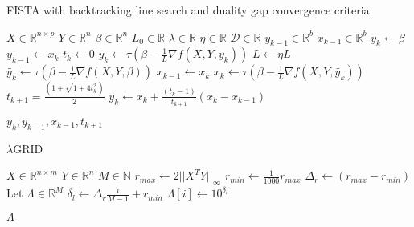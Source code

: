 \documentclass[letterpaper,11pt]{article}
\begin{document}
\begin{center}
\begin{center}
\begin{center}
\begin{center}
\FloatBarrier
\begin{algorithm}[!htbp]
  \caption{FISTA with backtracking line search and duality gap convergence criteria}
  \begin{algorithmic}[1]
  \Statex
  \Input{}
  \Statex $X \in \mathbb{R}^{n \times p} $ 
  \Statex $Y \in \mathbb{R}^n$  
  \Statex $\beta \in \mathbb{R}^n$  
  \Statex $L_0 \in \mathbb{R}$  
  \Statex $\lambda \in \mathbb{R}$  
  \Statex $\eta \in \mathbb{R}$  
  \Statex $\mathcal{D} \in \mathbb{R}$  
  \Statex $y_{k-1} \in \mathbb{R}^b$ 
  \Statex $x_{k-1} \in \mathbb{R}^b$ 
    \State $y_k \gets \beta$
      \Do
        \State $y_{k-1} \gets x_k$
        \State $t_k \gets 0$
        \State $ \widetilde{y_k} \gets \tau( \beta - \frac{1}{L} \nabla f( X, Y, y_k ) )$
          \State $L \gets \eta L$
          \State $\widetilde{y_k} \gets \tau( \beta - \frac{1}{L} \nabla f( X, Y, \beta ) )$
        \EndWhile
        \State $x_{k-1} \gets x_k$
        \State $x_k \gets \tau( \beta - \frac{1}{L} \nabla f( X, Y, \widetilde{y_k} ) )$
        \State $t_{k+1} = \frac{ \left( 1 + \sqrt{ 1 + 4 t_k^2} \right) }{ 2 }$
        \State $y_k \gets x_k + \frac{ \left( t_k - 1 \right) }{ t_{k+1} } \left( x_k - x_{k-1} \right)$
      \\
  \end{algorithmic}
  \Return $y_k, y_{k-1}, x_{k-1}, t_{k+1}$
\end{algorithm}
\FloatBarrier

\FloatBarrier
\begin{algorithm}[!htbp]
  \caption{ $\lambda$GRID }
  \begin{algorithmic}[1]
  \Statex
  \Input{}
  \Statex $X \in \mathbb{R}^{n \times m} $ 
  \Statex $Y \in \mathbb{R}^{n} $ 
  \Statex $M \in \mathbb{N} $ 
    \State $ r_{max} \gets 2 \lvert \lvert X^T Y \rvert \rvert_{\infty}$
    \State $ r_{min} \gets \frac{1}{1000} r_{max}$
    \State $ \Delta_r \gets \left( r_{max} - r_{min} \right)$
    \State Let $\Lambda \in \mathbb{R}^M$ 
      \State $\delta_l \gets \Delta_r \frac{ i }{ M - 1 } + r_{min}$ 
      \State $\Lambda[i] \gets 10^{\delta_l}$ 
    \EndFor
  \end{algorithmic}
  \Return $\Lambda$
\end{algorithm}
\FloatBarrier


\end{center}
\end{center}
\end{center}
\end{center}
\end{document}
